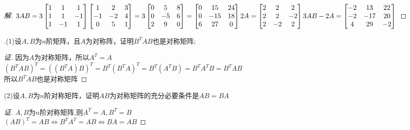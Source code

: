\documentclass[10pt,a4paper]{report}
\begin{document}
\begin{proof}[解]
	$3AB = 3\left[
	\begin{matrix}
	1 & 1 & 1 \\
	1 & 1 & -1 \\
	1 & -1 & 1 
	\end{matrix}
	\right]
	\left[
	\begin{matrix}
	1 & 2 & 3 \\
	-1 & -2 & 4 \\
	0 & 5 & 1 
	\end{matrix}
	\right] = 3
	\left[
	\begin{matrix}
	0 & 5 & 8 \\
	0 & -5 & 6 \\
	2 & 9 & 0 
	\end{matrix}
	\right] = 
	\left[
	\begin{matrix}
	0 & 15 & 24 \\
	0 & -15 & 18 \\
	6 & 27 & 0 
	\end{matrix}
	\right]\\
	2A = 
	\left[
	\begin{matrix}
	2 & 2 & 2 \\
	2 & 2 & -2 \\
	2 & -2 & 2 
	\end{matrix}
	\right]\\
	3AB-2A = 
	\left[
	\begin{matrix}
	-2 & 13 & 22 \\
	-2 & -17 & 20 \\
	4 & 29 & -2 
	\end{matrix}
	\right]
	$
\end{proof}
.(1)设$A,B$为$n$阶矩阵，且$A$为对称阵，证明$B^{T}AB$也是对称矩阵;
\begin{proof}[证]
	因为$A$为对称矩阵，所以$A^{T} = A$\\
	$(B^{T}AB)^{T} = ((B^{T}A)B)^{T} = B^{T}(B^{T}A)^{T} = B^{T}(A^{T}B) = B^{T}A^{T}B = B^{T}AB$\\
	所以$B^{T}AB$也是对称矩阵
\end{proof}

\noindent (2)设$A,B$为$n$阶对称矩阵，证明$AB$为对称矩阵的充分必要条件是$AB=BA$
\begin{proof}[证]
	$A,B$为$n$阶对称矩阵,则$A^{T} = A, B^{T} = B$\\
	$(AB)^{T} = AB \Leftrightarrow B^{T}A^{T} = AB \Leftrightarrow BA = AB$
\end{proof}
\end{document}
